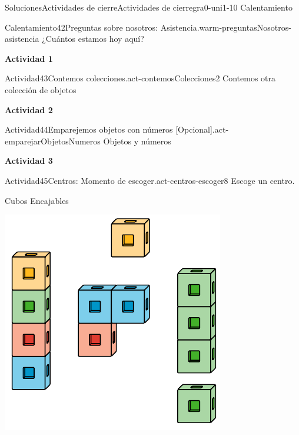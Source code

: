 \documentclass[twoside,10pt,]{article}
\begin{document}
\begin{solutions-section}{Soluciones}{Actividades de cierre}{}{Actividades de cierre}{}{}{gra0-uni1-10}
{\space\textperiodcentered\space{}Calentamiento}
\begin{explorationsolution}{Calentamiento}{42}{Preguntas sobre nosotros: Asistencia.}{warm-preguntasNosotros-asistencia}%
¿Cuántos estamos hoy aquí?%
\end{explorationsolution}%
\par\medskip
\noindent\textbf{\large{}\space\textperiodcentered\space{}Actividad 1}
\begin{activitysolution}{Actividad}{43}{Contemos colecciones.}{act-contemosColecciones2}%
Contemos otra colección de objetos%
\end{activitysolution}%
\par\medskip
\noindent\textbf{\large{}\space\textperiodcentered\space{}Actividad 2}
\begin{activitysolution}{Actividad}{44}{Emparejemos objetos con números [Opcional].}{act-emparejarObjetosNumeros}%
Objetos y números%
\end{activitysolution}%
\par\medskip
\noindent\textbf{\large{}\space\textperiodcentered\space{}Actividad 3}
\begin{activitysolution}{Actividad}{45}{Centros: Momento de escoger.}{act-centros-escoger8}%
Escoge un centro.%
\begin{sidebyside}{2}{0.025}{0.025}{0.05}%
\begin{sbspanel}{0.45}%
Cubos Encajables%
\par
\includegraphics[width=\linewidth]{external/svg-source/tikz-file-128850.pdf}

\end{sbspanel}
\end{sidebyside}
\end{activitysolution}
\end{solutions-section}
\end{document}

